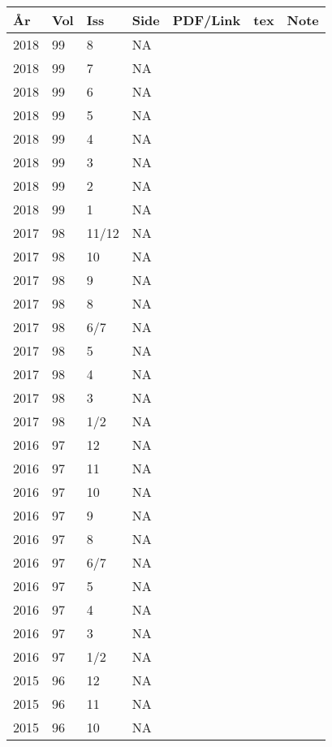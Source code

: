 \begin{longtable}{ |l|l|l|l|p{2.7cm}|l|p{2cm}| }
År & Vol & Iss & Side & PDF/Link & tex & Note \\
\hline
\endhead %
 2018 & 99 & 8     &      NA &  &  & \\
 2018 & 99 & 7     &      NA &  &  & \\
 2018 & 99 & 6     &      NA &  &  & \\
 2018 & 99 & 5     &      NA &  &  & \\
 2018 & 99 & 4     &      NA &  &  & \\
 2018 & 99 & 3     &      NA &  &  & \\
 2018 & 99 & 2     &      NA &  &  & \\
 2018 & 99 & 1     &      NA &  &  & \\
 2017 & 98 & 11/12 &      NA &  &  & \\
 2017 & 98 & 10    &      NA &  &  & \\
 2017 & 98 & 9     &      NA &  &  & \\
 2017 & 98 & 8     &      NA &  &  & \\
 2017 & 98 & 6/7   &      NA &  &  & \\
 2017 & 98 & 5     &      NA &  &  & \\
 2017 & 98 & 4     &      NA &  &  & \\
 2017 & 98 & 3     &      NA &  &  & \\
 2017 & 98 & 1/2   &      NA &  &  & \\
 2016 & 97 & 12    &      NA &  &  & \\
 2016 & 97 &    11 &      NA &  &  & \\
 2016 & 97 &    10 &      NA &  &  & \\
 2016 & 97 &     9 &      NA &  &  & \\
 2016 & 97 &     8 &      NA &  &  & \\
 2016 & 97 &   6/7 &      NA &  &  & \\
 2016 & 97 &     5 &      NA &  &  & \\
 2016 & 97 &     4 &      NA &  &  & \\
 2016 & 97 &     3 &      NA &  &  & \\
 2016 & 97 &   1/2 &      NA &  &  & \\
 2015 & 96 &    12 &      NA &  &  & \\
 2015 & 96 &    11 &      NA &  &  & \\
 2015 & 96 &    10 &      NA &  &  & \\

\end{longtable}
